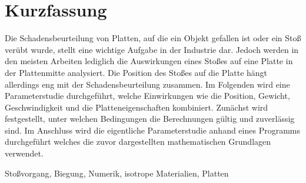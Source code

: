 \chapter*{Kurzfassung} 


Die Schadensbeurteilung von Platten, auf die ein Objekt gefallen ist oder ein Stoß verübt wurde, stellt eine wichtige Aufgabe in der Industrie dar. Jedoch werden in den meisten Arbeiten lediglich die Auswirkungen eines Stoßes auf eine Platte in der Plattenmitte analysiert. Die Position des Stoßes auf die Platte hängt allerdings eng mit der Schadensbeurteilung zusammen. Im Folgenden wird eine Parameterstudie durchgeführt, welche Einwirkungen wie die Position, Gewicht, Geschwindigkeit und die Platteneigenschaften kombiniert. Zunächst wird festgestellt, unter welchen Bedingungen die Berechnungen gültig und zuverlässig sind. Im Anschluss wird die eigentliche Parameterstudie anhand eines Programms durchgeführt welches die zuvor dargestellten mathematischen Grundlagen verwendet.
\begin{keywords}
Stoßvorgang, Biegung, Numerik, isotrope Materialien, Platten
\end{keywords}